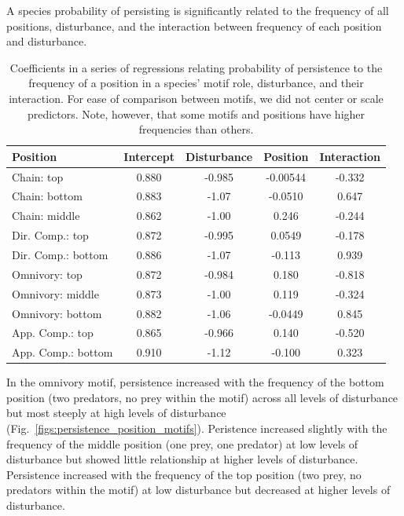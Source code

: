 \documentclass[12pt]{article}
\begin{document}
\begin{spacing}{2.0}
        A species probability of persisting is significantly related to the frequency of all positions, disturbance, and the interaction between frequency of each position and disturbance.
        \begin{table}[h!]
            \caption{Coefficients in a series of regressions relating probability of persistence to the frequency of a position in a species' motif role, disturbance, and their interaction. For ease of comparison between motifs, we did not center or scale predictors. Note, however, that some motifs and positions have higher frequencies than others.}
            \label{tab:persistence_vs_positions}
            \centering
            \begin{tabular}{l | c c c c}
            Position	& Intercept	& Disturbance	& Position	& Interaction \\
            \hline
            Chain: top	& 0.880 &	-0.985 & -0.00544 & -0.332 \\
            Chain: bottom	& 0.883 &	-1.07 &	-0.0510 &	0.647 \\
            Chain: middle	& 0.862 & -1.00 &	0.246 &	-0.244 \\
            \hline
            Dir. Comp.: top & 0.872 &	-0.995	& 0.0549 &	-0.178 \\
            Dir. Comp.: bottom & 0.886 &	-1.07 &	-0.113 &	0.939 \\
            \hline
            Omnivory: top	& 0.872 &	-0.984 &	0.180 &	-0.818 \\
            Omnivory: middle & 0.873 & -1.00 &	0.119 &	-0.324 \\
            Omnivory: bottom & 0.882 & -1.06 &	-0.0449 &	0.845 \\
            \hline
            App. Comp.: top & 0.865 &	-0.966 &	0.140 &	-0.520 \\
            App. Comp.: bottom & 0.910 &	-1.12 &	-0.100 &	0.323 \\
            \hline
            \end{tabular}
        \end{table}
        
        In the omnivory motif, persistence increased with the frequency of the bottom position (two predators, no prey within the motif) across all levels of disturbance but most steeply at high levels of disturbance (Fig.~\ref{figs:persistence_position_motifs}).
        Peristence increased slightly with the frequency of the middle position (one prey, one predator) at low levels of disturbance but showed little relationship at higher levels of disturbance.
        Persistence increased with the frequency of the top position (two prey, no predators within the motif) at low disturbance but decreased at higher levels of disturbance.
        

\end{spacing}
\end{document}
